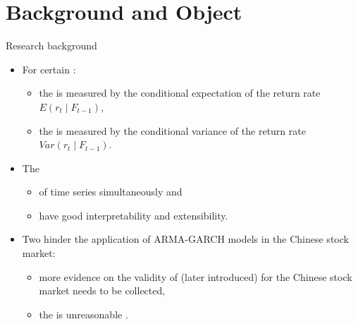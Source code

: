 \section{Background and Object}
\begin{frame}{Research background}
  \begin{itemize}
    \item For certain :
      \begin{itemize}
        \item the  is measured by the conditional expectation of the return rate $E(r_{t}\mid F_{t-1})$,
        \item the  is measured by the conditional variance of the return rate $Var(r_{t}\mid F_{t-1})$.
      \end{itemize}
    \item The  
      \begin{itemize}
        \item {} of time series simultaneously and
        \item have good interpretability and extensibility.
      \end{itemize}
    \item Two  hinder the application of ARMA-GARCH models in the Chinese stock market:
      \begin{itemize}
        \item more evidence on the validity of  (later introduced) for the Chinese stock market needs to be collected,
        \item the  is unreasonable .
      \end{itemize}
  \end{itemize}
\end{frame}

